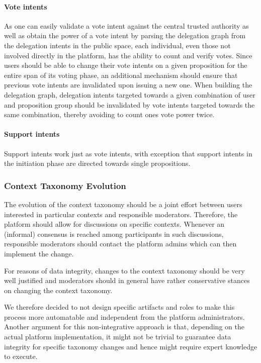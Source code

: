 \paragraph{Vote intents}
As one can easily validate a vote intent against the central trusted authority as well as obtain the power of a vote intent by parsing the delegation graph from the delegation intents in the public space, each individual, even those not involved directly in the platform, has the ability to count and verify votes.
Since users should be able to change their vote intents on a given proposition for the entire span of its voting phase, an additional mechanism should ensure that previous vote intents are invalidated upon issuing a new one.
When building the delegation graph, delegation intents targeted towards a given combination of user and proposition group should be invalidated by vote intents targeted towards the same combination, thereby avoiding to count ones vote power twice.

\paragraph{Support intents}
Support intents work just as vote intents, with exception that support intents in the initiation phase are directed towards single propositions. 


\subsubsection{Context Taxonomy Evolution}
\label{ssec:Context_Taxonomy_Evolution}
The evolution of the context taxonomy should be a joint effort between users interested in particular contexts and responsible moderators.
Therefore, the platform should allow for discussions on specific contexts.
Whenever an (informal) consensus is reached among participants in such discussions, responsible moderators should contact the platform admins which can then implement the change.

For reasons of data integrity, changes to the context taxonomy should be very well justified and moderators should in general have rather conservative stances on changing the context taxonomy.

We therefore decided to not design specific artifacts and roles to make this process more automatable and independent from the platform administrators.
Another argument for this non-integrative approach is that, depending on the actual platform implementation, it might not be trivial to guarantee data integrity for specific taxonomy changes and hence might require expert knowledge to execute.


